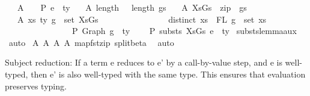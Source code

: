 \begin{isabellebody}
\ \ \ A{}{\isacharcolon}{\kern0pt}\ {\isachardoublequoteopen}{\isasymGamma}\ {\isacharat}{\kern0pt}\ {\isasymGamma}{}\ {\isasymturnstile}{\isacharbraceleft}{\kern0pt}P{\isacharbraceright}{\kern0pt}\ e{}\ {\isacharcolon}{\kern0pt}\ ty{}{\isachardoublequoteclose}\isanewline
\ \ \ A{}{\isacharcolon}{\kern0pt}\ {\isachardoublequoteopen}length\ {\isasymGamma}\ {\isacharequal}{\kern0pt}\ length\ gs{\isachardoublequoteclose}\isanewline
\ \ \ A{}{\isacharcolon}{\kern0pt}\ {\isachardoublequoteopen}XsGs\ {\isacharequal}{\kern0pt}\ zip\ {\isasymGamma}\ gs{\isachardoublequoteclose}\isanewline
\ \ \ A{}{\isacharcolon}{\kern0pt}\ {\isachardoublequoteopen}{\isasymforall}{\isacharparenleft}{\kern0pt}{\isacharparenleft}{\kern0pt}xs{\isacharcomma}{\kern0pt}\ ty{\isacharparenright}{\kern0pt}{\isacharcomma}{\kern0pt}\ g{\isacharparenright}{\kern0pt}\ {\isasymin}\ set\ XsGs{\isachardot}{\kern0pt}\ {\isacharparenleft}{\kern0pt}\isanewline
\ \ \ \ \ \ \ \ \ \ \ \ \ \ \ distinct\ xs\ {\isasymand}\ FL\ g\ {\isacharequal}{\kern0pt}\ set\ xs\ {\isasymand}\isanewline
\ \ \ \ \ \ \ \ \ \ \ \ \ \ \ {\isacharbrackleft}{\kern0pt}{\isacharbrackright}{\kern0pt}\ {\isasymturnstile}{\isacharbraceleft}{\kern0pt}P{\isacharbraceright}{\kern0pt}\ Graph\ g\ {\isacharcolon}{\kern0pt}\ ty{\isacharparenright}{\kern0pt}{\isachardoublequoteclose}\isanewline
\ \ \ {\isachardoublequoteopen}{\isasymGamma}{}\ {\isasymturnstile}{\isacharbraceleft}{\kern0pt}P{\isacharbraceright}{\kern0pt}\ substs\ XsGs\ e{}\ {\isacharcolon}{\kern0pt}\ ty{}{\isachardoublequoteclose}\isanewline
%
\isadelimproof
%
\endisadelimproof
%
\isatagproof
{}\isamarkupfalse%
\ substs{\isacharunderscore}{\kern0pt}lemma{\isacharunderscore}{\kern0pt}aux\ \isamarkupfalse%
\ auto\isanewline
{}\isamarkupfalse%
\ A{}\ A{}\ A{}\ A{}\ map{\isacharunderscore}{\kern0pt}fst{\isacharunderscore}{\kern0pt}zip\ split{\isacharunderscore}{\kern0pt}beta\ \isamarkupfalse%
\ auto%
\endisatagproof
{\isafoldproof}%
%
\isadelimproof
%
\endisadelimproof
%
\begin{isamarkuptext}%
Subject reduction:
  If a term e reduces to e' by a call-by-value step,
  and e is well-typed,
  then e' is also well-typed with the same type.
  This ensures that evaluation preserves typing.%

\end{isamarkuptext}
\end{isabellebody}

